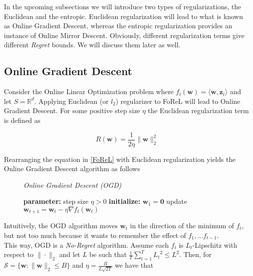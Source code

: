 In the upcoming subsections we will introduce two types of regularizations, the Euclidean and the entropic. Euclidean regularization will lead to what is known as Online Gradient Descent, whereas the entropic regularization provides an instance of Online Mirror Descent. Obviously, different regularization terms give different \textit{Regret} bounds. We will discuss them later as well. 


\subsection{Online Gradient Descent}\label{subsection:onlineGradientAscent}

Consider the Online Linear Optimization problem where $f_t(\textbf{w}) = \langle \textbf{w},\textbf{z}_t \rangle$ and let $S = \mathbb{R}^d$. Applying Euclidean (or $l_2$) regularizer to FoReL will lead to Online Gradient Descent. For some positive step size $\eta$ the Euclidean regularization term is defined as

\begin{equation}\label{euclideanReg}
    R(\textbf{w}) = \frac{1}{2\eta}\|\textbf{w}\|_2^2
\end{equation}

Rearranging the equation in \ref{FoReL} with Euclidean regularization yields the Online Gradient Descent algorithm as follows

\begin{figure}[H]\centering
    \textit{Online Gradient Descent (OGD)}
    \begin{minipage}{.7\linewidth}
        \begin{algorithm}[H]
        \DontPrintSemicolon
        \textbf{parameter: }  step size $\eta > 0$ \;
        \textbf{initialize: } $\textbf{w}_1 = \textbf{0}$ \;
         {
        update $\textbf{w}_{t+1} = \textbf{w}_t - \eta\nabla f_t(\textbf{w}_t)$ \;
        }
        \end{algorithm}\caption*{}
  \end{minipage}
\end{figure}

Intuitively, the OGD algorithm moves $\textbf{w}_t$ in the direction of the minimum of $f_t$, but not too much because it wants to remember the effect of $f_1,\dots f_{t-1}$. \\
This way, OGD is a \textit{No-Regret} algorithm. Assume each $f_t$ is $L_t$-Lipschitz with respect to $\|\cdot\|_2$ and let $L$ be such that $\frac{1}{T}\sum_{t=1}^{T}{L_t}^2\le L^2$. Then, for $ \mathcal{S} = \{\textbf{w}: \|\textbf{w}\|_2 \le B\}$ and $\eta = \frac{B}{L\sqrt{2T}}$ we have that \cite[Cor. 2.7]{shalev}

